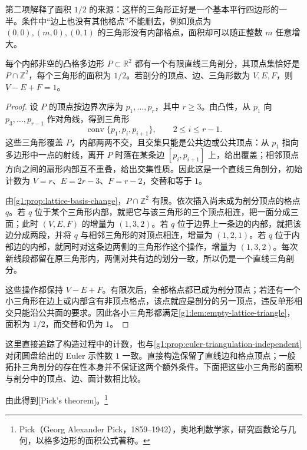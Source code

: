 第二项解释了面积 \(1/2\) 的来源：这样的三角形正好是一个基本平行四边形的一半。条件中“边上也没有其他格点”不能删去，例如顶点为 \((0,0),(m,0),(0,1)\) 的三角形没有内部格点，面积却可以随正整数 \(m\) 任意增大。

\begin{lemma}
	\label{g1:lem:lattice-polygon-triangulation}
	每个内部非空的凸格多边形 \(P\subset\mathbb R^2\) 都有一个有限直线三角剖分，其顶点集恰好是 \(P\cap\mathbb Z^2\)，每个三角形的面积为 \(1/2\)。若剖分的顶点、边、三角形数为 \(V,E,F\)，则 \(V-E+F=1\)。
\end{lemma}
\begin{proof}
	设 \(P\) 的顶点按边界次序为 \(p_1,\ldots,p_r\)，其中 \(r\ge3\)。由凸性，从 \(p_1\) 向 \(p_3,\ldots,p_{r-1}\) 作对角线，得到三角形
	\[
		\operatorname{conv}\{p_1,p_i,p_{i+1}\},\qquad 2\le i\le r-1.
	\]
	这些三角形覆盖 \(P\)，内部两两不交，且交集只能是公共边或公共顶点：从 \(p_1\) 指向多边形中一点的射线，离开 \(P\) 时落在某条边 \([p_i,p_{i+1}]\) 上，给出覆盖；相邻顶点方向之间的扇形内部互不重叠，给出交集性质。因此这是一个直线三角剖分，初始计数为 \(V=r\)、\(E=2r-3\)、\(F=r-2\)，交替和等于 \(1\)。

	由\cref{g1:prop:lattice-basis-change}，\(P\cap\mathbb Z^2\) 有限。依次插入尚未成为剖分顶点的格点 \(q\)。若 \(q\) 位于某个三角形内部，就把它与该三角形的三个顶点相连，把一面分成三面；此时 \((V,E,F)\) 的增量为 \((1,3,2)\)。若 \(q\) 位于边界上一条边的内部，就把该边分成两段，并将 \(q\) 与相邻三角形的对顶点相连，增量为 \((1,2,1)\)。若 \(q\) 位于内部边的内部，就同时对这条边两侧的三角形作这个操作，增量为 \((1,3,2)\)。每次新线段都留在原三角形内，两侧对共有边的划分一致，所以仍是一个直线三角剖分。

	这些操作都保持 \(V-E+F\)。有限次后，全部格点都已成为剖分顶点；若还有一个小三角形在边上或内部含有非顶点格点，该点就应是剖分的另一顶点，违反单形相交只能沿公共面的要求。因此各小三角形都满足\cref{g1:lem:empty-lattice-triangle}，面积为 \(1/2\)，而交替和仍为 \(1\)。
\end{proof}

这里直接追踪了构造过程中的计数，也与\cref{g1:prop:euler-triangulation-independent}对闭圆盘给出的 Euler 示性数 \(1\) 一致。直接构造保留了直线边和格点顶点；一般拓扑三角剖分的存在性本身并不保证这两个额外条件。下面把这些小三角形的面积与剖分中的顶点、边、面计数相比较。

由此得到[Pick's theorem]。\footnote{Pick（Georg Alexander Pick，1859--1942），奥地利数学家，研究函数论与几何，以格多边形的面积公式著称。}

